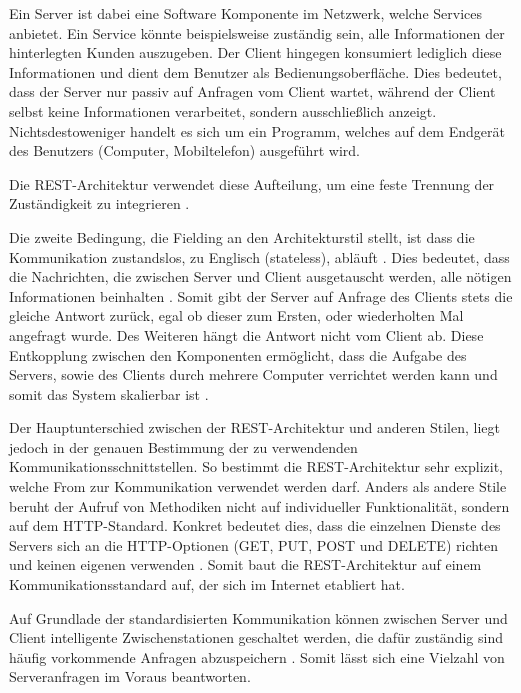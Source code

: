 Ein Server ist dabei eine Software Komponente im Netzwerk, welche Services anbietet. Ein Service könnte beispielsweise zuständig sein, alle Informationen der hinterlegten Kunden auszugeben. Der Client hingegen konsumiert lediglich diese Informationen und dient dem Benutzer als Bedienungsoberfläche. Dies bedeutet, dass der Server nur passiv auf Anfragen vom Client wartet, während der Client selbst keine Informationen verarbeitet, sondern ausschließlich anzeigt. Nichtsdestoweniger handelt es sich um ein Programm, welches auf dem Endgerät des Benutzers (Computer, Mobiltelefon) ausgeführt wird.

Die REST-Architektur verwendet diese Aufteilung, um eine feste Trennung der Zuständigkeit zu integrieren \parencite[vgl.][S. 78]{fielding_architectural_2000}.

Die zweite Bedingung, die Fielding an den Architekturstil stellt, ist dass die Kommunikation zustandslos, zu Englisch (stateless), abläuft \parencite[][S. 78]{fielding_architectural_2000}. Dies bedeutet, dass die Nachrichten, die zwischen Server und Client ausgetauscht werden, alle nötigen Informationen beinhalten \parencite[][S. 128]{starke_effektive_2015}. Somit gibt der Server auf Anfrage des Clients stets die gleiche Antwort zurück, egal ob dieser zum Ersten, oder wiederholten Mal angefragt wurde. Des Weiteren hängt die Antwort nicht vom Client ab.
Diese Entkopplung zwischen den Komponenten ermöglicht, dass die Aufgabe des Servers, sowie des Clients durch mehrere Computer verrichtet werden kann und somit das System skalierbar ist \parencite[][S. 79]{fielding_architectural_2000}.

Der Hauptunterschied zwischen der REST-Architektur und anderen Stilen, liegt jedoch in der genauen Bestimmung der zu verwendenden Kommunikationsschnittstellen. So bestimmt die REST-Architektur sehr explizit, welche From zur Kommunikation verwendet werden darf. Anders als andere Stile beruht der Aufruf von Methodiken nicht auf individueller Funktionalität, sondern auf dem HTTP-Standard. Konkret bedeutet dies, dass die einzelnen Dienste des Servers sich an die HTTP-Optionen (GET, PUT, POST und DELETE) richten und keinen eigenen verwenden \parencite[vlg.][S. 128]{starke_effektive_2015}. Somit baut die REST-Architektur auf einem Kommunikationsstandard auf, der sich im Internet etabliert hat.

Auf Grundlade der standardisierten Kommunikation können zwischen Server und Client intelligente Zwischenstationen geschaltet werden, die dafür zuständig sind häufig vorkommende Anfragen abzuspeichern \parencites[vlg.][S. 79 f.]{fielding_architectural_2000}[][S. 128]{starke_effektive_2015}. Somit lässt sich eine Vielzahl von Serveranfragen im Voraus beantworten.

